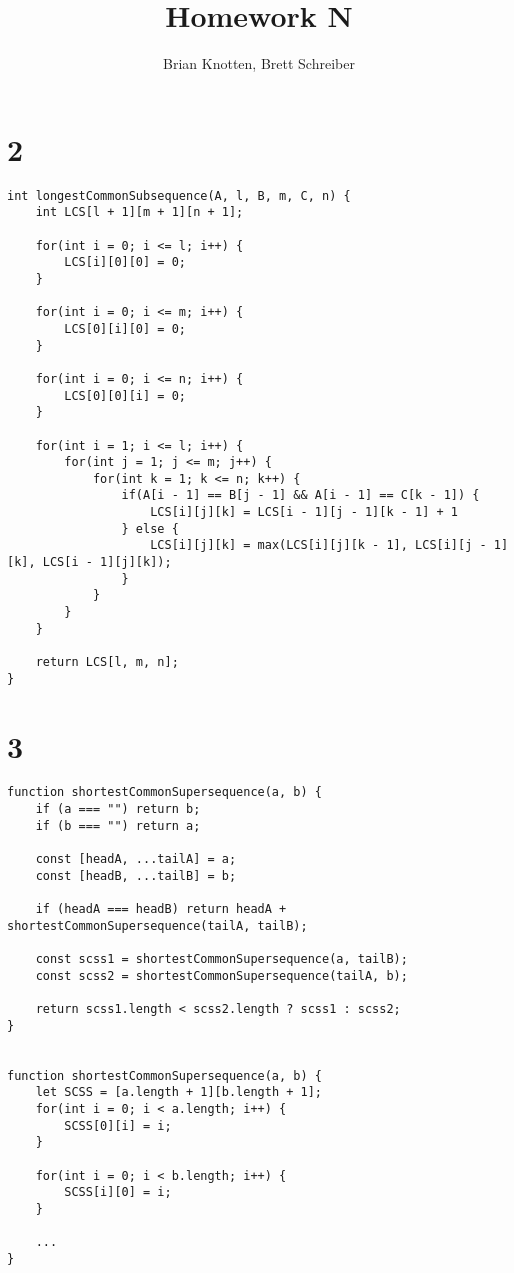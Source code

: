 \documentclass[letterpaper,notitlepage,twoside]{article}
\begin{document}
\title{Homework N}
\author{Brian Knotten, Brett Schreiber}
\maketitle

\section*{2}
\begin{verbatim}
int longestCommonSubsequence(A, l, B, m, C, n) {
    int LCS[l + 1][m + 1][n + 1];

    for(int i = 0; i <= l; i++) {
        LCS[i][0][0] = 0;
    }

    for(int i = 0; i <= m; i++) {
        LCS[0][i][0] = 0;
    }

    for(int i = 0; i <= n; i++) {
        LCS[0][0][i] = 0;
    }

    for(int i = 1; i <= l; i++) {
        for(int j = 1; j <= m; j++) {
            for(int k = 1; k <= n; k++) {
                if(A[i - 1] == B[j - 1] && A[i - 1] == C[k - 1]) {
                    LCS[i][j][k] = LCS[i - 1][j - 1][k - 1] + 1
                } else {
                    LCS[i][j][k] = max(LCS[i][j][k - 1], LCS[i][j - 1][k], LCS[i - 1][j][k]);
                }
            }
        }
    }

    return LCS[l, m, n];
}
\end{verbatim}
\section*{3}
\begin{verbatim}
function shortestCommonSupersequence(a, b) {
	if (a === "") return b;
	if (b === "") return a;
	
	const [headA, ...tailA] = a;
	const [headB, ...tailB] = b;
	
	if (headA === headB) return headA + shortestCommonSupersequence(tailA, tailB);
	
	const scss1 = shortestCommonSupersequence(a, tailB);
	const scss2 = shortestCommonSupersequence(tailA, b);
	
	return scss1.length < scss2.length ? scss1 : scss2;
}


function shortestCommonSupersequence(a, b) {
	let SCSS = [a.length + 1][b.length + 1];
	for(int i = 0; i < a.length; i++) {
		SCSS[0][i] = i;
	}
	
	for(int i = 0; i < b.length; i++) {
		SCSS[i][0] = i;
	}
  
	...
}
\end{verbatim}
\end{document}
